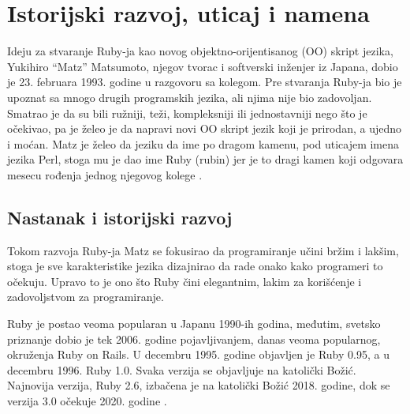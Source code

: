 \documentclass[a4paper]{article}
\begin{document}

\section{Istorijski razvoj, uticaj i namena}
Ideju za stvaranje Ruby-ja kao novog objektno-orijentisanog (OO) skript jezika, Yukihiro “Matz” Matsumoto, njegov tvorac i softverski inženjer iz Japana, dobio je 23. februara 1993. godine u razgovoru sa kolegom. Pre stvaranja Ruby-ja bio je upoznat sa mnogo drugih programskih jezika, ali njima nije bio zadovoljan. Smatrao je da su bili ružniji, teži, kompleksniji ili jednostavniji nego što je očekivao, pa je želeo je da napravi novi OO skript jezik koji je prirodan, a ujedno i moćan. Matz je želeo da jeziku da ime po dragom kamenu, pod uticajem imena jezika Perl, stoga mu je dao ime Ruby (rubin) jer je to dragi kamen koji odgovara mesecu rođenja jednog njegovog kolege \cite{rubyTalk}\cite{rubyProgLang}.

\subsection{Nastanak i istorijski razvoj}
 
Tokom razvoja Ruby-ja Matz se fokusirao da programiranje učini bržim i lakšim, stoga je sve karakteristike jezika dizajnirao da rade onako kako programeri to očekuju. Upravo to je ono što Ruby čini elegantnim, lakim za korišćenje i zadovoljstvom za programiranje.

Ruby je postao veoma popularan u Japanu 1990-ih godina, međutim, svetsko priznanje dobio je tek 2006. godine pojavljivanjem, danas veoma popularnog, okruženja Ruby on Rails. U decembru 1995. godine objavljen je Ruby 0.95, a u decembru 1996. Ruby 1.0. Svaka verzija se objavljuje na katolički Božić. Najnovija verzija, Ruby 2.6, izbačena je na katolički Božić 2018. godine, dok se verzija 3.0 očekuje 2020. godine \cite{rubyTalk}\cite{rubyProgLang}.
\end{document}
